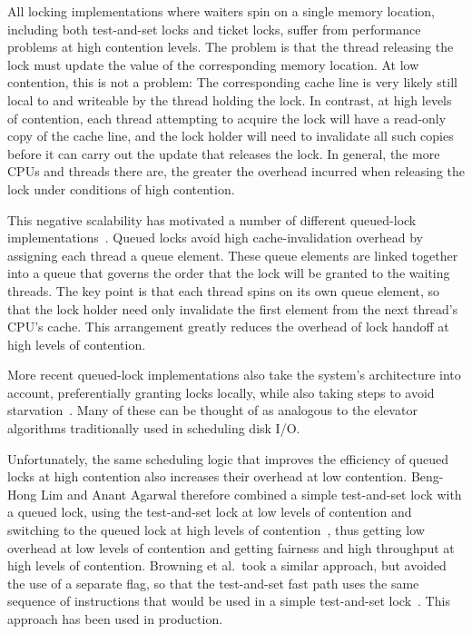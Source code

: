 All locking implementations where waiters spin on a single memory
location, including both test-and-set locks and ticket locks,
suffer from performance problems at high contention levels.
The problem is that the thread releasing the lock must update the
value of the corresponding memory location.
At low contention, this is not a problem: The corresponding cache line
is very likely still local to and writeable by the thread holding
the lock.
In contrast, at high levels of contention, each thread attempting to
acquire the lock will have a read-only copy of the cache line, and
the lock holder will need to invalidate all such copies before it
can carry out the update that releases the lock.
In general, the more CPUs and threads there are, the greater the
overhead incurred when releasing the lock under conditions of
high contention.

This negative scalability has motivated a number of different
queued-lock
implementations~\cite{Anderson90,Graunke90,MellorCrummey91a,Wisniewski94,Craig93,Magnusson94,Takada93}.
Queued locks avoid high cache-invalidation overhead by assigning each
thread a queue element.
These queue elements are linked together into a queue that governs the
order that the lock will be granted to the waiting threads.
The key point is that each thread spins on its own queue element,
so that the lock holder need only invalidate the first element from
the next thread's CPU's cache.
This arrangement greatly reduces the overhead of lock handoff at high
levels of contention.

More recent queued-lock implementations also take the system's architecture
into account, preferentially granting locks locally, while also taking
steps to avoid
starvation~\cite{McKenney02e,radovic03hierarchical,radovic02efficient,BenJackson02,McKenney02d}.
Many of these can be thought of as analogous to the elevator algorithms
traditionally used in scheduling disk I/O.

Unfortunately, the same scheduling logic that improves the efficiency
of queued locks at high contention also increases their overhead at
low contention.
Beng-Hong Lim and Anant Agarwal therefore combined a simple test-and-set
lock with a queued lock, using the test-and-set lock at low levels of
contention and switching to the queued lock at high levels of
contention~\cite{BengHongLim94}, thus getting low overhead at low levels
of contention and getting fairness and high throughput at high levels
of contention.
Browning et al.~took a similar approach, but avoided the use of a separate
flag, so that the test-and-set fast path uses the same sequence of
instructions that would be used in a simple test-and-set
lock~\cite{LukeBrowning2005SimpleLockNUMAAware}.
This approach has been used in production.

